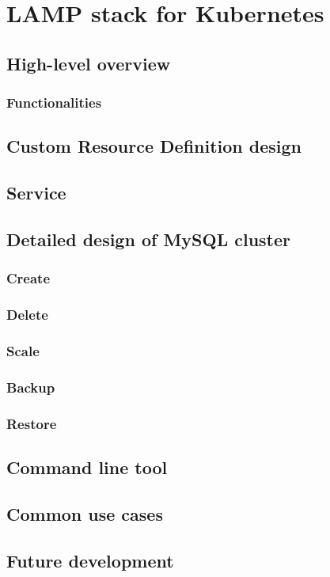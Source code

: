 \chapter{LAMP stack for Kubernetes}

\section{High-level overview}
\subsection{Functionalities}

\section{Custom Resource Definition design}

\section{Service}

\section{Detailed design of MySQL cluster}
\subsection{Create}
\subsection{Delete}
\subsection{Scale}
\subsection{Backup}
\subsection{Restore}


\section{Command line tool}

\section{Common use cases}

\section{Future development}
